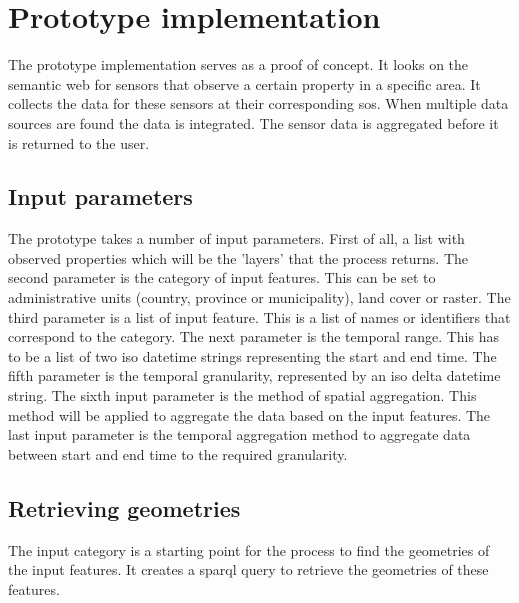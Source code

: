

\chapter{Prototype implementation}
The prototype implementation serves as a proof of concept. It looks on the semantic web for sensors that observe a certain property in a specific area. It collects the data for these sensors at their corresponding \acl{sos}. When multiple data sources are found the data is integrated. The sensor data is aggregated before it is returned to the user.

\section{Input parameters}
The prototype takes a number of input parameters. First of all, a list with observed properties which will be the 'layers' that the process returns. The second parameter is the category of input features. This can be set to administrative units (country, province or municipality), land cover or raster. The third parameter is a list of input feature. This is a list of names or identifiers that correspond to the category. The next parameter is the temporal range. This has to be a list of two \ac{iso} datetime strings representing the start and end time. The fifth parameter is the temporal granularity, represented by an \ac{iso} delta datetime string. The sixth input parameter is the method of spatial aggregation. This method will be applied to aggregate the data based on the input features. The last input parameter is the temporal aggregation method to aggregate data between start and end time to the required granularity.      

\section{Retrieving geometries}
The input category is a starting point for the process to find the geometries of the input features. It creates a \ac{sparql} query to retrieve the geometries of these features. 

